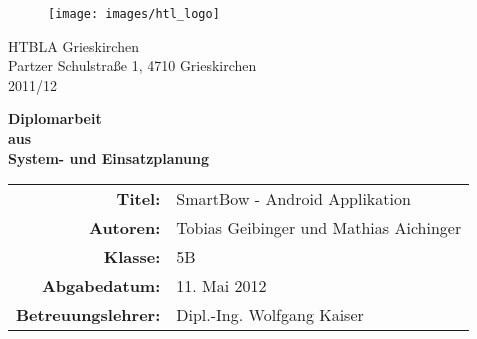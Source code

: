 
\begin{titlepage}

	\begin{figure}[H]
	\hspace{10cm}
		\texttt{[image: images/htl\_logo]}
	\end{figure}
	\vspace*{3cm}
	
	\begin{center}
		\Huge
		HTBLA Grieskirchen\\
		\vspace{0.5cm}
		\large
		Partzer Schulstraße 1, 4710 Grieskirchen\\
		\vspace{1.5cm}
		\Large
		2011/12\\		
		
		\vspace{1.5cm}	
			
		
		\Huge
		\textbf{Diplomarbeit}\\
		\vspace{1em}
		\textbf{aus}\\
		\vspace{1em}
		\textbf{System- und Einsatzplanung}\\
		\vspace{4cm}
		\normalsize
	\end{center}
	
	\hspace{2.85cm}
	\begin{tabular}{rl}
		\textbf{Titel:}   & SmartBow - Android Applikation\\
		\textbf{Autoren:}   & Tobias Geibinger und Mathias Aichinger\\
		\textbf{Klasse:}   & 5B\\
		\textbf{Abgabedatum:}   & 11. Mai 2012\\
		\textbf{Betreuungslehrer:}   & Dipl.-Ing. Wolfgang Kaiser\\
	\end{tabular}
	
	\normalsize
\end{titlepage}

%
%
